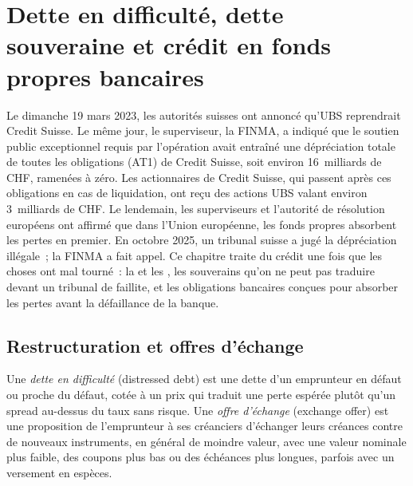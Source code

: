 \chapter{Dette en difficulté, dette souveraine et crédit en fonds propres bancaires}\label{ch:m2:distressed-sovereign-and-bank-capital-credit}

Le dimanche 19 mars 2023, les autorités suisses ont annoncé qu'UBS reprendrait Credit
Suisse. Le même jour, le superviseur, la FINMA, a indiqué que le soutien public exceptionnel
requis par l'opération avait entraîné une dépréciation totale de toutes les obligations
 (AT1) de Credit Suisse, soit environ 16~milliards de CHF, ramenées à zéro. Les actionnaires
de Credit Suisse, qui passent après ces obligations en cas de liquidation, ont reçu des actions UBS valant environ 3~milliards de CHF.
Le lendemain, les superviseurs et l'autorité de résolution européens ont affirmé que dans
l'Union européenne, les fonds propres absorbent les pertes en premier. En octobre 2025, un tribunal suisse a jugé
la dépréciation illégale~; la FINMA a fait appel. Ce chapitre traite du crédit une fois que les choses ont mal tourné~:
la  et les , les souverains qu'on ne peut pas traduire
devant un tribunal de faillite, et les obligations bancaires conçues pour absorber les pertes avant la défaillance de la banque.

\section{Restructuration et offres d'échange}

\begin{definition}\label{def:m2:distressed-sovereign-and-bank-capital-credit:distressed}
Une \emph{dette en difficulté} (distressed debt) est une dette d'un emprunteur en défaut ou proche du défaut,
cotée à un prix qui traduit une perte espérée plutôt qu'un spread au-dessus du
taux sans risque. Une \emph{offre d'échange} (exchange offer) est une proposition de l'emprunteur à ses créanciers
d'échanger leurs créances contre de nouveaux instruments, en général de moindre valeur, avec
une valeur nominale plus faible, des coupons plus bas ou des échéances plus longues, parfois avec un versement en espèces.
\end{definition}

